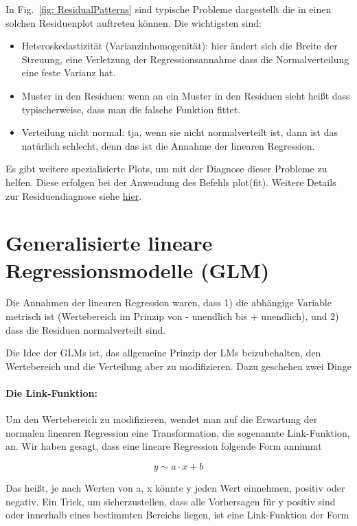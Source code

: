 \documentclass[a4paper,twoside]{tufte-book}\usepackage[]{graphicx}\usepackage[]{color}
\begin{document}
In Fig.~\ref{fig: ResidualPatterns} sind typische Probleme dargestellt die in einen solchen Residuenplot auftreten können. Die wichtigsten sind:

\begin{itemize}
  \item Heteroskedastizität (Varianzinhomogenität): hier ändert sich die Breite der Streuung, eine Verletzung der Regressionsannahme dass die Normalverteilung eine feste Varianz hat. 
  \item Muster in den Residuen: wenn an ein Muster in den Residuen sieht heißt dass typischerweise, dass man die falsche Funktion fittet. 
  \item Verteilung nicht normal: tja, wenn sie nicht normalverteilt ist, dann ist das natürlich schlecht, denn das ist die Annahme der linearen Regression. 
\end{itemize}  

Es gibt weitere spezialisierte Plots, um mit der Diagnose dieser Probleme zu helfen. Diese erfolgen bei der Anwendung des Befehls plot(fit). Weitere Details zur Residuendiagnose siehe \href{http://www.statmethods.net/stats/rdiagnostics.html}{hier}.


\section{Generalisierte lineare Regressionsmodelle (GLM)}

Die Annahmen der linearen Regression waren, dass 1) die abhängige Variable metrisch ist (Wertebereich im Prinzip von - unendlich bis + unendlich), und 2) dass die Residuen normalverteilt sind. 

Die Idee der GLMs ist, das allgemeine Prinzip der LMs beizubehalten, den Wertebereich und die Verteilung aber zu modifizieren. Dazu geschehen zwei Dinge

\paragraph{Die Link-Funktion:} Um den Wertebereich zu modifizieren, wendet man auf die Erwartung der normalen linearen Regression eine Transformation, die sogenannte Link-Funktion, an. Wir haben gesagt, dass eine lineare Regression folgende Form annimmt

\begin{equation}
y \sim a \cdot x + b 
\end{equation}

Das heißt, je nach Werten von a, x könnte y jeden Wert einnehmen, positiv oder negativ. Ein Trick, um sicherzustellen, dass alle Vorhersagen für y positiv sind oder innerhalb eines bestimmten Bereichs liegen, ist eine Link-Funktion der Form
\end{document}

